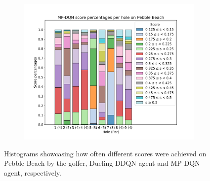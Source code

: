 \documentclass{kththesis}
\begin{document}
\begin{figure}
\begin{subfigure}{\textwidth}
    \end{subfigure}
    \begin{subfigure}{\textwidth}
    \centering
    \includegraphics[height=0.3\textheight]{AgentPercentages/MPDQN_Score_Percentages_Pebble.png} 
    \end{subfigure}
    \caption{Histograms showcasing how often different scores were achieved on Pebble Beach by the golfer, Dueling DDQN agent and MP-DQN agent, respectively.}
    \label{fig:pebble_score_histograms}
\end{figure}
\end{document}
